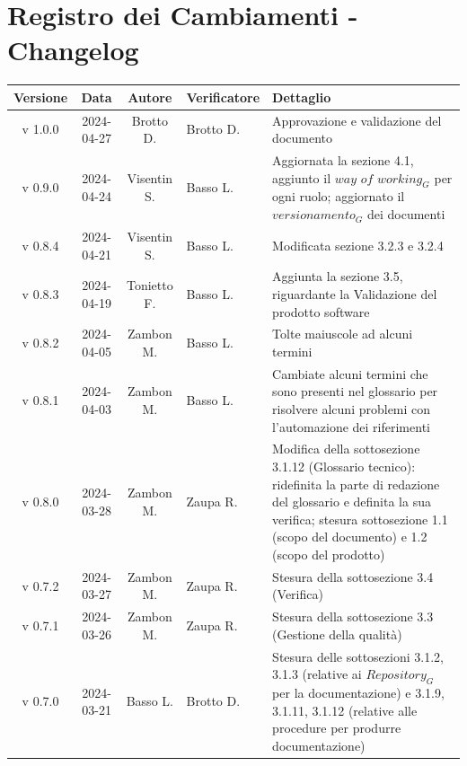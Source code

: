 \documentclass[12pt, oneside]{article}
\begin{document}
\section*{Registro dei Cambiamenti - Changelog}
\begin{longtable}{|c|c|c|p{3cm}|p{6cm}|}
\hline
\textbf{Versione} & \textbf{Data} & \textbf{Autore} & \textbf{Verificatore} & \textbf{Dettaglio} \\
\hline
v 1.0.0 & 2024-04-27 & Brotto D. & Brotto D. & Approvazione e validazione del documento \\
\hline
v 0.9.0 & 2024-04-24 & Visentin S. & Basso L. & Aggiornata la sezione 4.1, aggiunto il $\textit{way of working}_G$ per ogni ruolo; aggiornato il $\textit{versionamento}_G$ dei documenti \\
\hline
v 0.8.4 & 2024-04-21 & Visentin S. & Basso L. & Modificata sezione 3.2.3 e 3.2.4 \\
\hline
v 0.8.3 & 2024-04-19 & Tonietto F. & Basso L. & Aggiunta la sezione 3.5, riguardante la Validazione del prodotto software\\
\hline
v 0.8.2 & 2024-04-05 & Zambon M. & Basso L. & Tolte maiuscole ad alcuni termini\\
\hline
v 0.8.1 & 2024-04-03 & Zambon M. & Basso L. & Cambiate alcuni termini che sono presenti nel glossario per risolvere alcuni problemi con l'automazione dei riferimenti\\
\hline
v 0.8.0 & 2024-03-28 & Zambon M. & Zaupa R. & Modifica della sottosezione 3.1.12 (Glossario tecnico): ridefinita la parte di redazione del glossario e definita la sua verifica; stesura sottosezione 1.1 (scopo del documento) e 1.2 (scopo del prodotto)\\
\hline
v 0.7.2 & 2024-03-27 & Zambon M. & Zaupa R. & Stesura della sottosezione 3.4 (Verifica)\\
\hline
v 0.7.1 & 2024-03-26 & Zambon M. & Zaupa R. & Stesura della sottosezione 3.3 (Gestione della qualità)\\
\hline
v 0.7.0 & 2024-03-21 & Basso L. & Brotto D. & Stesura delle sottosezioni 3.1.2, 3.1.3 (relative ai $\textit{Repository}_G$ per la documentazione) e 3.1.9, 3.1.11, 3.1.12 (relative alle procedure per produrre documentazione)\\
\hline


\end{longtable}
\end{document}
